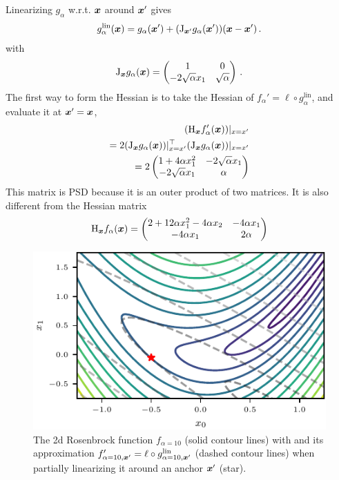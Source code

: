 \begin{example}
  Linearizing $g_{\alpha}$ w.r.t. ${\bm{x}}$ around ${\bm{x}}'$ gives
  \begin{align*}
    g^{\text{lin}}_{\alpha}({\bm{x}}) = g_{\alpha}({\bm{x}}') + (\mathrm{J}_{{\bm{x}}'}g_{\alpha}({\bm{x}}')) ({\bm{x}} - {\bm{x}}')\,.
  \end{align*}
  with
  \begin{align*}
    \mathrm{J}_{{\bm{x}}}g_{\alpha}({\bm{x}})
    =
    \begin{pmatrix}
      1 & 0 \\
      -2 \sqrt{\alpha} x_1 & \sqrt{\alpha}
    \end{pmatrix}\,.
  \end{align*}
  The first way to form the Hessian is to take the Hessian of $f_{\alpha}' = \ell \circ g_{\alpha}^{\text{lin}}$, and evaluate it at ${\bm{x}}' = {\bm{x}}$,
  \begin{align*}
    (\mathrm{H}_{{\bm{x}}} f_{\alpha}'({\bm{x}}))|_{x=x'}
    \\
    =
    2 (\mathrm{J}_{{\bm{x}}} g_{\alpha}({\bm{x}}))|_{x=x'}^{\top}
    (\mathrm{J}_{{\bm{x}}} g_{\alpha}({\bm{x}}))|_{x=x'}
    \\
    =
    2
    \begin{pmatrix}
      1 + 4\alpha x_1^2& -2 \sqrt{\alpha} x_1\\
      -2 \sqrt{\alpha} x_1 & \alpha
    \end{pmatrix}
  \end{align*}
  This matrix is PSD because it is an outer product of two matrices.
  It is also different from the Hessian matrix
  \begin{align*}
    \mathrm{H}_{{\bm{x}}} f_{\alpha}({\bm{x}})
    =
    \begin{pmatrix}
      2 + 12 \alpha x_1^2 - 4 \alpha x_2 & -4 \alpha x_1 \\
      -4 \alpha x_1 & 2 \alpha
    \end{pmatrix}
  \end{align*}
  \begin{figure}[H]
    \centering
    \includegraphics[width=\linewidth]{../kfs/plots/linearized_rosenbrock.pdf}
    \caption{The 2d Rosenbrock function $f_{\alpha=10}$ (solid contour lines) with and its approximation $f'_{\alpha=10, {\bm{x}}'} = \ell \circ g^{\text{lin}}_{\alpha=10, {\bm{x}}'}$ (dashed contour lines) when partially linearizing it around an anchor ${\bm{x}}'$ (star).}
  \end{figure}
\end{example}

